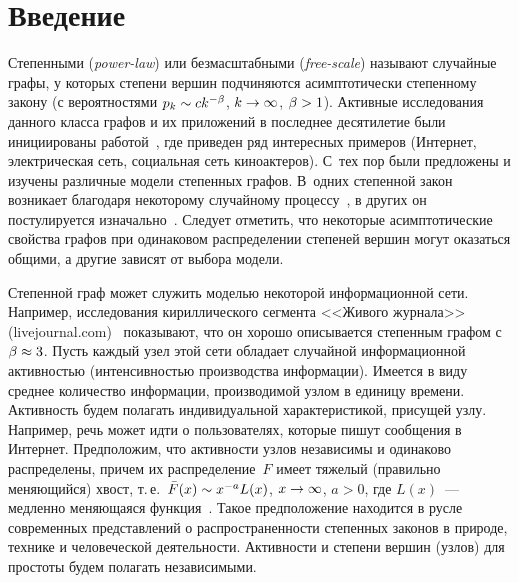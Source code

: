       \begin{multicols}{2}
      
            \label{st\stat}
            


\section{Введение}

    Степенными (\textit{power-law}) или безмасштабными (\textit{free-scale}) называют
    случайные графы, у которых степени вершин подчиняются асимптотически
    степенному закону (с вероятностями $p_k\hm\sim ck^{-\beta}$, $k\hm\to\infty$,
    $\beta\hm>1$).
    Активные исследования данного класса графов и их приложений
    в последнее десятилетие были инициированы работой~\cite{Bar},
    где приведен ряд интересных примеров (Интернет, электрическая сеть,
    социальная сеть киноактеров).
    С~тех пор были предложены и изучены различные модели степенных графов.
    В~одних степенной закон возникает благодаря некоторому случайному
    процессу~\cite{Bar, Komp}, в других он постулируется изначально~\cite{Pow, Reit}.
    Следует отметить, что некоторые асимптотические свойства графов при
    одинаковом распределении степеней вершин могут оказаться общими,
    а другие зависят от выбора модели.

    Степенной граф может служить моделью некоторой информационной сети.
    Например, исследования кириллического сегмента <<Живого журнала>>
    ({\sf livejournal.com})~\cite{Komp}
    показывают, что он хорошо описывается степенным графом с $\beta\hm\approx 3$.
    Пусть каждый узел этой сети обладает случайной информационной активностью
    (интенсивностью производства информации). Имеется в виду среднее количество
    информации, производимой узлом в единицу времени. Активность будем
    полагать индивидуальной характеристикой, присущей узлу. Например, речь может идти
    о пользователях, которые пишут сообщения в Интернет.
    Предположим, что активности узлов
    независимы и одинаково распределены, причем их распределение~$F$ имеет тяжелый
    (правильно меняющийся) хвост, т.\,е.\ ${\bar F}(x)\hm\sim x^{-a}L(x)$,
    $x\hm\to\infty$, $a>0$, где $L(x)$~--- медленно меняющаяся функция~\cite[\S\ 8.8]{Fel}. 
    Такое предположение находится в русле современных
    представлений о распространенности степенных законов в природе, технике и
    человеческой деятельности. Активности и степени вершин (узлов) для
    простоты будем полагать независимыми.


\end{multicols}
